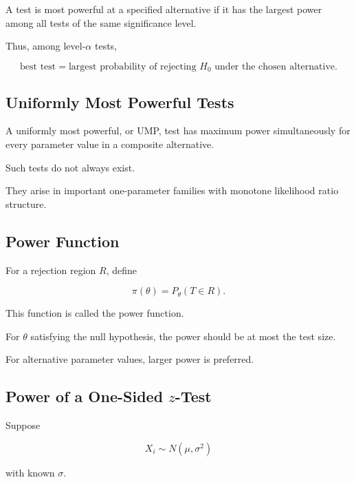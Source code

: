 A test is most powerful at a specified alternative if it has the largest
power among all tests of the same significance level.

Thus, among level-\(\alpha\) tests,

\[
\boxed{
\text{best test}
=
\text{largest probability of rejecting }H_0
\text{ under the chosen alternative}.
}
\]

\subsection{Uniformly Most Powerful Tests}
\label{subsec:ump-tests}

A uniformly most powerful, or UMP, test has maximum power simultaneously
for every parameter value in a composite alternative.

Such tests do not always exist.

They arise in important one-parameter families with monotone likelihood
ratio structure.

\subsection{Power Function}
\label{subsec:power-function}

For a rejection region \(R\), define

\[
\boxed{
\pi(\theta)
=
P_\theta(T\in R).
}
\]

This function is called the power function.

For \(\theta\) satisfying the null hypothesis, the power should be at
most the test size.

For alternative parameter values, larger power is preferred.

\subsection{Power of a One-Sided \(z\)-Test}
\label{subsec:power-one-sided-z}

Suppose

\[
X_i
\sim
N(\mu,\sigma^2)
\]

with known \(\sigma\).

